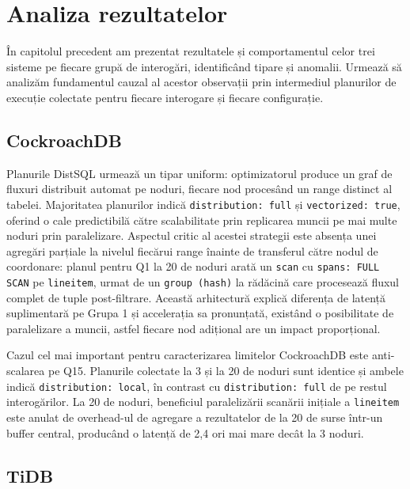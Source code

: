 \chapter{Analiza rezultatelor}

În capitolul precedent am prezentat rezultatele și comportamentul celor trei sisteme pe fiecare grupă de interogări, identificând tipare și anomalii. Urmează să analizăm fundamentul cauzal al acestor observații prin intermediul planurilor de execuție colectate pentru fiecare interogare și fiecare configurație.

\section{CockroachDB}

Planurile DistSQL urmează un tipar uniform: optimizatorul produce un graf de fluxuri distribuit automat pe noduri, fiecare nod procesând un range distinct al tabelei. Majoritatea planurilor indică \texttt{distribution: full} și \texttt{vectorized: true}, oferind o cale predictibilă către scalabilitate prin replicarea muncii pe mai multe noduri prin paralelizare. Aspectul critic al acestei strategii este absența unei agregări parțiale la nivelul fiecărui range înainte de transferul către nodul de coordonare: planul pentru Q1 la 20 de noduri arată un \texttt{scan} cu \texttt{spans: FULL SCAN} pe \texttt{lineitem}, urmat de un \texttt{group (hash)} la rădăcină care procesează fluxul complet de tuple post-filtrare. Această arhitectură explică diferența de latență suplimentară pe Grupa 1 și accelerația sa pronunțată, existând o posibilitate de paralelizare a muncii, astfel fiecare nod adițional are un impact proporțional. 

Cazul cel mai important pentru caracterizarea limitelor CockroachDB este anti-scalarea pe Q15. Planurile colectate la 3 și la 20 de noduri sunt identice și ambele indică \texttt{distribution: local}, în contrast cu \texttt{distribution: full} de pe restul interogărilor.  La 20 de noduri, beneficiul paralelizării scanării inițiale a \texttt{lineitem} este anulat de overhead-ul de agregare a rezultatelor de la 20 de surse într-un buffer central, producând o latență de 2,4 ori mai mare decât la 3 noduri.

\section{TiDB}

